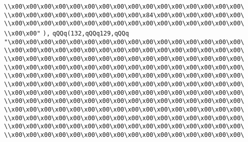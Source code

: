 \verb|\\x00\x00\x00\x00\x00\x00\x00\x00\x00\x00\x00\x00\x00\x00\x00\x00\|\newline
\verb|\\x00\x00\x00\x00\x00\x00\x00\x00\x00\x84\x00\x00\x00\x00\x00\x00\|\newline
\verb|\\x00\x00\x00\x00\x00\x00\x00\x00\x00\x00\x00\x00\x00\x00\x00\x00\|\newline
\verb|\\x00\x00"|\newline
\verb|),|\newline
\verb|qQQq(132,qQQq129,qQQq|\newline
\verb|"\x00\x00\x00\x00\x00\x00\x00\x00\x00\x00\x00\x00\x00\x00\x00\x00\|\newline
\verb|\\x00\x00\x00\x00\x00\x00\x00\x00\x00\x00\x00\x00\x00\x00\x00\x00\|\newline
\verb|\\x00\x00\x00\x00\x00\x00\x00\x00\x00\x00\x00\x00\x00\x00\x00\x00\|\newline
\verb|\\x00\x00\x00\x00\x00\x00\x00\x00\x00\x00\x00\x00\x00\x00\x00\x00\|\newline
\verb|\\x00\x00\x00\x00\x00\x00\x00\x00\x00\x00\x00\x00\x00\x00\x00\x00\|\newline
\verb|\\x00\x00\x00\x00\x00\x00\x00\x00\x00\x00\x00\x00\x00\x00\x00\x00\|\newline
\verb|\\x00\x00\x00\x00\x00\x00\x00\x00\x00\x00\x00\x00\x00\x00\x00\x00\|\newline
\verb|\\x00\x00\x00\x00\x00\x00\x00\x00\x00\x00\x00\x00\x00\x00\x00\x00\|\newline
\verb|\\x00\x00\x00\x00\x00\x00\x00\x00\x00\x00\x00\x00\x00\x00\x00\x00\|\newline
\verb|\\x00\x00\x00\x00\x00\x00\x00\x00\x00\x00\x00\x00\x00\x00\x00\x00\|\newline
\verb|\\x00\x00\x00\x00\x00\x00\x00\x00\x00\x00\x00\x00\x00\x00\x00\x00\|\newline
\verb|\\x00\x00\x00\x00\x00\x00\x00\x00\x00\x00\x00\x00\x00\x00\x00\x00\|\newline
